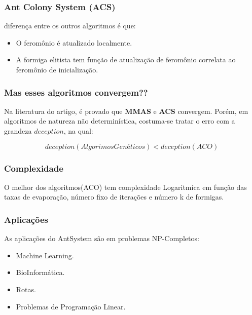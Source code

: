 \documentclass[compress]{beamer}
\begin{document}
\begin{frame}

\frametitle{ Ant Colony System (ACS)}
 diferença entre os outros algoritmos é que:
\begin{itemize}
  \item O feromônio é atualizado localmente.
  \item A formiga elitista tem função de atualização de feromônio correlata ao feromônio de inicialização.
\end{itemize}

\end{frame}

\begin{frame}

\frametitle{Mas esses algoritmos convergem??}

Na literatura do artigo, é provado que \textbf{MMAS} e \textbf{ACS} convergem.
Porém, em algoritmos de natureza não determinística, costuma-se tratar o erro com a grandeza $deception$, na qual:

$$deception(Algorimos Genéticos)<deception(ACO)$$

\end{frame}



\begin{frame}
    \frametitle{Complexidade}
    O melhor dos algoritmos(ACO) tem complexidade Logaritmíca em função das taxas de evaporação, número fixo de iterações e número k de formigas. 
    
    
\end{frame}




\begin{frame}
    \frametitle{Aplicações}
    As aplicações do AntSystem são em problemas NP-Completos:

\begin{itemize}
  \item Machine Learning.
  \item BioInformática.
  \item Rotas.
  \item Problemas de Programação Linear.
\end{itemize}

    

\end{frame}





\end{document}
